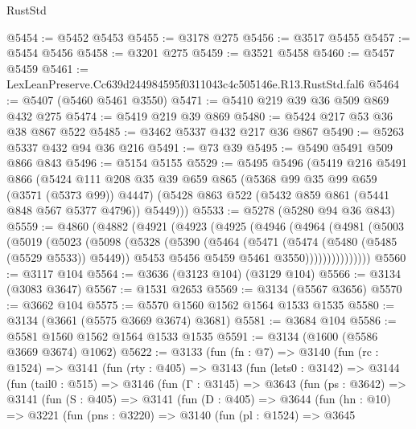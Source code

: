 \begin{lexlean}{RustStd}
\begin{coremodule}
@5454 := @5452 @5453
@5455 := @3178 @275
@5456 := @3517 @5455
@5457 := @5454 @5456
@5458 := @3201 @275
@5459 := @3521 @5458
@5460 := @5457 @5459
@5461 := LexLeanPreserve.Cc639d244984595f0311043c4c505146e.R13.RustStd.fal6
@5464 := @5407 (@5460 @5461 @3550)
@5471 := @5410 @219 @39 @36 @509 @869 @432 @275
@5474 := @5419 @219 @39 @869
@5480 := @5424 @217 @53 @36 @38 @867 @522
@5485 := @3462 @5337 @432 @217 @36 @867
@5490 := @5263 @5337 @432 @94 @36 @216
@5491 := @73 @39
@5495 := @5490 @5491 @509 @866 @843
@5496 := @5154 @5155
@5529 := @5495
    @5496
    (@5419
      @216
      @5491
      @866
      (@5424
        @111
        @208
        @35
        @39
        @659
        @865
        (@5368 @99 @35 @99 @659 (@3571 (@5373 @99)) @4447)
        (@5428 @863 @522 (@5432 @859 @861 (@5441 @848 @567 @5377 @4796)) @5449)))
@5533 := @5278 (@5280 @94 @36 @843)
@5559 := @4860
    (@4882
      (@4921
        (@4923
          (@4925
            (@4946
              (@4964
                (@4981
                  (@5003
                    (@5019
                      (@5023
                        (@5098
                          (@5328
                            (@5390
                              (@5464
                                (@5471
                                  (@5474 (@5480 (@5485 (@5529 @5533)) @5449))
                                  @5453
                                  @5456
                                  @5459
                                  @5461
                                  @3550)))))))))))))))
@5560 := @3117 @104
@5564 := @3636 (@3123 @104) (@3129 @104)
@5566 := @3134 (@3083 @3647)
@5567 := @1531 @2653
@5569 := @3134 (@5567 @3656)
@5570 := @3662 @104
@5575 := @5570 @1560 @1562 @1564 @1533 @1535
@5580 := @3134 (@3661 (@5575 @3669 @3674) @3681)
@5581 := @3684 @104
@5586 := @5581 @1560 @1562 @1564 @1533 @1535
@5591 := @3134 (@1600 (@5586 @3669 @3674) @1062)
@5622 := @3133
    (fun (fn : @7) =>
    @3140
      (fun (rc : @1524) =>
      @3141
        (fun (rty : @405) =>
        @3143
          (fun (lets0 : @3142) =>
          @3144
            (fun (tail0 : @515) =>
            @3146
              (fun (Γ : @3145) =>
              @3643
                (fun (ps : @3642) =>
                @3141
                  (fun (S : @405) =>
                  @3141
                    (fun (D : @405) =>
                    @3644
                      (fun (hn : @10) =>
                      @3221
                        (fun (pns : @3220) =>
                        @3140
                          (fun (pl : @1524) =>
                          @3645

\end{coremodule}
\end{lexlean}
